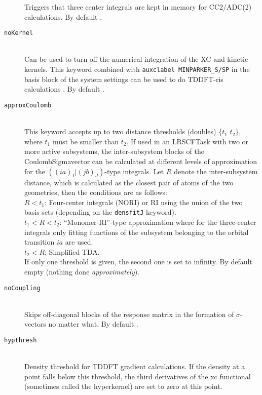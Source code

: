 \begin{description}
	  Triggers that three center integrals are kept in memory for CC2/ADC(2) calculations. By default .
    \item[\texttt{noKernel}]\hfill \\ 
	  Can be used to turn off the numerical integration of the XC and kinetic kernels. This keyword combined with
    \texttt{auxclabel MINPARKER\_S/SP} in the basis block of the system settings can be used to do TDDFT-ris calculations 
    \cite{zhou2023minimal}. By default .
    \item[\texttt{approxCoulomb}]\hfill \\
	  This keyword accepts up to two distance thresholds (doubles) \{$t_1$ $t_2$\}, where $t_1$ must be smaller than $t_2$.
    If used in an LRSCFTask with two or more active subsystems, the inter-subsystem blocks of the CoulombSigmavector
    can be calculated at different levels of approximation for the $((ia)_I|(jb)_J)$-type integrals. Let $R$ denote the
    inter-subsystem distance, which is calculated as the closest pair of atoms of the two geometries, then the conditions are as follows:\\
    $R < t_1$: Four-center integrals (NORI) or RI using the union of the two basis sets (depending on the \texttt{densfitJ} keyword).\\
    $t_1 < R < t_2$: ``Monomer-RI''-type approximation where for the three-center integrals only fitting functions of the subsystem belonging to the orbital transition $ia$ are used. \\
    $t_2 < R$: Simplified TDA. \\
    If only one threshold is given, the second one is set to infinity. By default empty (nothing done \emph{approximately}).
    \item[\texttt{noCoupling}]\hfill \\
	  Skips off-diagonal blocks of the response matrix in the formation of $\sigma$-vectors no matter what. By default .
    \item[\texttt{hypthresh}]\hfill \\
    Density threshold for TDDFT gradient calculations. If the density at a point falls below this threshold, the third derivatives of the xc functional (sometimes called the hyperkernel) are set to zero at this point. 
\end{description}

